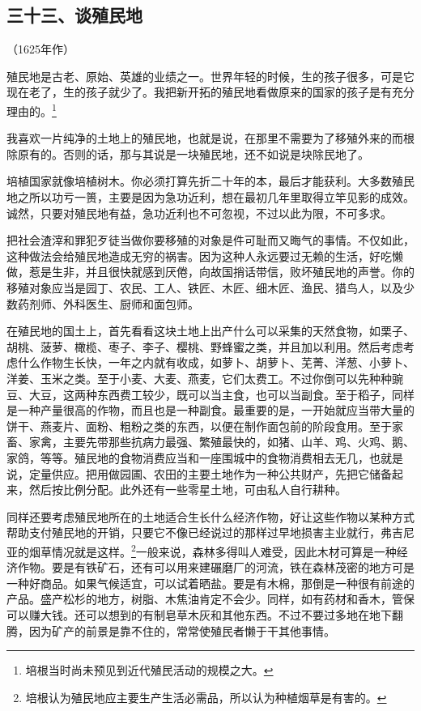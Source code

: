 \subsection*{三十三、谈殖民地}
\begin{center}
    （1625年作）
\end{center}
\par 殖民地是古老、原始、英雄的业绩之一。世界年轻的时候，生的孩子很多，可是它现在老了，生的孩子就少了。我把新开拓的殖民地看做原来的国家的孩子是有充分理由的。\footnote{培根当时尚未预见到近代殖民活动的规模之大。}
\par 我喜欢一片纯净的土地上的殖民地，也就是说，在那里不需要为了移殖外来的而根除原有的。否则的话，那与其说是一块殖民地，还不如说是块除民地了。
\par 培植国家就像培植树木。你必须打算先折二十年的本，最后才能获利。大多数殖民地之所以功亏一篑，主要是因为急功近利，想在最初几年里取得立竿见影的成效。诚然，只要对殖民地有益，急功近利也不可忽视，不过以此为限，不可多求。
\par 把社会渣滓和罪犯歹徒当做你要移殖的对象是件可耻而又晦气的事情。不仅如此，这种做法会给殖民地造成无穷的祸害。因为这种人永远要过无赖的生活，好吃懒做，惹是生非，并且很快就感到厌倦，向故国捎话带信，败坏殖民地的声誉。你的移殖对象应当是园丁、农民、工人、铁匠、木匠、细木匠、渔民、猎鸟人，以及少数药剂师、外科医生、厨师和面包师。
\par 在殖民地的国土上，首先看看这块土地上出产什么可以采集的天然食物，如栗子、胡桃、菠萝、橄榄、枣子、李子、樱桃、野蜂蜜之类，并且加以利用。然后考虑考虑什么作物生长快，一年之内就有收成，如萝卜、胡萝卜、芜菁、洋葱、小萝卜、洋姜、玉米之类。至于小麦、大麦、燕麦，它们太费工。不过你倒可以先种种豌豆、大豆，这两种东西费工较少，既可以当主食，也可以当副食。至于稻子，同样是一种产量很高的作物，而且也是一种副食。最重要的是，一开始就应当带大量的饼干、燕麦片、面粉、粗粉之类的东西，以便在制作面包前的阶段食用。至于家畜、家禽，主要先带那些抗病力最强、繁殖最快的，如猪、山羊、鸡、火鸡、鹅、家鸽，等等。殖民地的食物消费应当和一座围城中的食物消费相去无几，也就是说，定量供应。把用做园圃、农田的主要土地作为一种公共财产，先把它储备起来，然后按比例分配。此外还有一些零星土地，可由私人自行耕种。
\par 同样还要考虑殖民地所在的土地适合生长什么经济作物，好让这些作物以某种方式帮助支付殖民地的开销，只要它不像已经说过的那样过早地损害主业就行，弗吉尼亚的烟草情况就是这样。\footnote{培根认为殖民地应主要生产生活必需品，所以认为种植烟草是有害的。}一般来说，森林多得叫人难受，因此木材可算是一种经济作物。要是有铁矿石，还有可以用来建碾磨厂的河流，铁在森林茂密的地方可是一种好商品。如果气候适宜，可以试着晒盐。要是有木棉，那倒是一种很有前途的产品。盛产松杉的地方，树脂、木焦油肯定不会少。同样，如有药材和香木，管保可以赚大钱。还可以想到的有制皂草木灰和其他东西。不过不要过多地在地下翻腾，因为矿产的前景是靠不住的，常常使殖民者懒于干其他事情。
